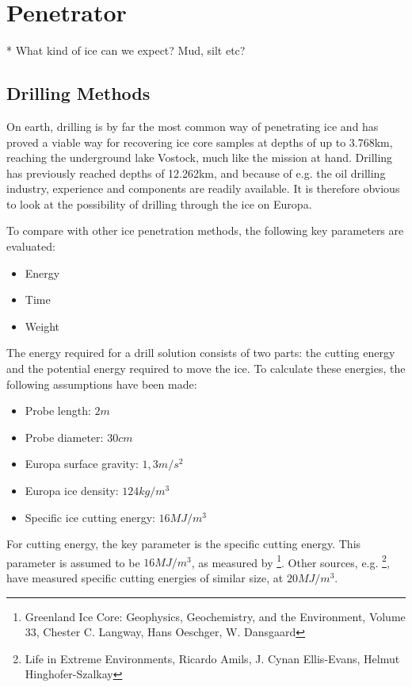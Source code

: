 \chapter{Penetrator}

* What kind of ice can we expect? Mud, silt etc?

\section{Drilling Methods}

On earth, drilling is by far the most common way of penetrating ice and has proved a viable way for recovering ice core samples at depths of up to 3.768km, reaching the underground lake Vostock, much like the mission at hand. Drilling has previously reached depths of 12.262km, and because of e.g. the oil drilling industry, experience and components are readily available. It is therefore obvious to look at the possibility of drilling through the ice on Europa.

To compare with other ice penetration methods, the following key parameters are evaluated:
\begin{itemize}
    \item Energy
	\item Time
	\item Weight
\end{itemize}
The energy required for a drill solution consists of two parts: the cutting energy and the potential energy required to move the ice. To calculate these energies, the following assumptions have been made:
\begin{itemize}
	\item Probe length:   $2m$
	\item Probe diameter:   $30cm$
	\item Europa surface gravity:   $1,3m/s^2$
	\item Europa ice density:   $124kg/m^3$
	\item Specific ice cutting energy:   $16MJ/m^3$
\end{itemize}
For cutting energy, the key parameter is the specific cutting energy. This parameter is assumed to be $16MJ/m^3$, as measured by \footnote{Greenland Ice Core: Geophysics, Geochemistry, and the Environment, Volume 33,  Chester C. Langway, Hans Oeschger, W. Dansgaard}. Other sources, e.g. \footnote{Life in Extreme Environments, Ricardo Amils, J. Cynan Ellis-Evans, Helmut Hinghofer-Szalkay}, have measured specific cutting energies of similar size, at $20MJ/m^3$.


